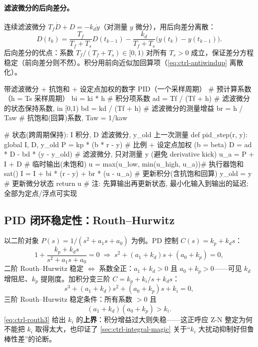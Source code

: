 \paragraph{滤波微分的后向差分。}
连续滤波微分 $T_f\dot D+D=-k_d\dot y$（对测量 $y$ 微分），用后向差分离散\cite{astrom2008feedback}：
\begin{equation}
  D(t_k)=\frac{T_f}{T_f+T_s}D(t_{k-1})-\frac{k_d}{T_f+T_s}\big(y(t_k)-y(t_{k-1})\big).
  \label{eq:ctrl-pid-Ddiff}
\end{equation}
后向差分的优点：系数 $T_f/(T_f+T_s)\in[0,1)$ 对所有 $T_s>0$ 成立，保证差分方程稳定（前向差分则不然）。积分用前向近似加回算项（\cref{eq:ctrl-antiwindup} 离散化）。

\begin{codebox}[Python]{带滤波微分 + 抗饱和 + 设定点加权的数字 PID（一个采样周期）}
# 预计算系数（h = Ts 采样周期）
bi = ki * h                 # 积分项系数
ad = Tf / (Tf + h)          # 滤波微分的状态保持系数, in [0,1)
bd = kd / (Tf + h)          # 滤波微分的测量增益
br = h / Taw                # 抗饱和(回算)系数, Taw = 1/kaw

# 状态(跨周期保持): I 积分, D 滤波微分, y_old 上一次测量
def pid_step(r, y):
    global I, D, y_old
    P  = kp * (b * r - y)            # 比例 + 设定点加权 (b = beta)
    D  = ad * D - bd * (y - y_old)   # 滤波微分, 只对测量 y (避免 derivative kick)
    u_a = P + I + D                  # 临时输出(未饱和)
    u  = max(u_low, min(u_high, u_a))# 执行器饱和 sat()
    I  = I + bi * (r - y) + br * (u - u_a)  # 更新积分(含抗饱和回算)
    y_old = y                        # 更新微分状态
    return u
# 注: 先算输出再更新状态, 最小化输入到输出的延迟; 全部为定点/浮点可实现
\end{codebox}

\subsection{PID 闭环稳定性：Routh--Hurwitz}
\label{sec:ctrl-pid-routh}

以二阶对象 $P(s)=1/(s^2+a_1s+a_0)$ 为例。PD 控制 $C(s)=k_p+k_ds$：
\begin{equation}
  1+\frac{k_p+k_ds}{s^2+a_1s+a_0}=0\;\Rightarrow\;s^2+(a_1+k_d)s+(a_0+k_p)=0,
\end{equation}
二阶 Routh--Hurwitz 稳定 $\iff$ 系数全正：$a_1+k_d>0$ 且 $a_0+k_p>0$——可见 $k_d$ 增阻尼、$k_p$ 提刚度。加积分变三阶 $C=k_p+k_i/s+k_ds$：
\begin{equation}
  s^3+(a_1+k_d)s^2+(a_0+k_p)s+k_i=0,
\end{equation}
三阶 Routh--Hurwitz 稳定条件：所有系数 $>0$ 且
\begin{equation}
  (a_1+k_d)(a_0+k_p)>k_i.
  \label{eq:ctrl-routh3}
\end{equation}
\cref{eq:ctrl-routh3} 给出 $k_i$ 的\textbf{上界}：积分增益过大则失稳——这正呼应 Z-N 整定为何不能把 $k_i$ 取得太大，也印证了 \cref{sec:ctrl-integral-magic} 关于“$k_i$ 大扰动抑制好但鲁棒性差”的论断。

